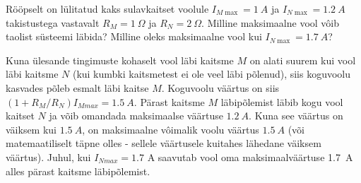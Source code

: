 
Rööpselt on lülitatud kaks sulavkaitset voolule $I_{M \max }=\SI{1}{A}$ ja $I_{N \max }=\SI{1,2}{A}$ takistustega vastavalt $R_{M}=\SI{1}{\Omega}$ ja $R_{N}=\SI{2}{\Omega}$. Milline maksimaalne vool vôib taolist süsteemi läbida? Milline oleks maksimaalne vool kui $I_{N \max }=\SI{1,7}{A}$?

\hint

\solu
Kuna ülesande tingimuste kohaselt vool läbi kaitsme $M$ on alati suurem kui vool läbi kaitsme $N$ (kui kumbki kaitsmetest ei ole veel läbi põlenud), siis koguvoolu kasvades põleb esmalt läbi kaitse $M$. Koguvoolu väärtus on siis $\left(1+R_{M} / R_{N}\right) I_{M max }=\SI{1,5}{A}$. Pärast kaitsme $M$ läbipõlemist läbib kogu vool kaitset $N$ ja võib omandada maksimaalse väärtuse $\SI{1,2}{A}$. Kuna see väärtus on väiksem kui $\SI{1,5}{A}$, on maksimaalne vôimalik voolu väärtus $\SI{1,5}{A}$ (või matemaatiliselt täpne olles - sellele väärtusele kuitahes lähedane väiksem väärtus). Juhul, kui $I_{N max }=\num{1,7}$ A saavutab vool oma maksimaalväärtuse \SI{1,7}{A} alles pärast kaitsme läbipõlemist.
\probend